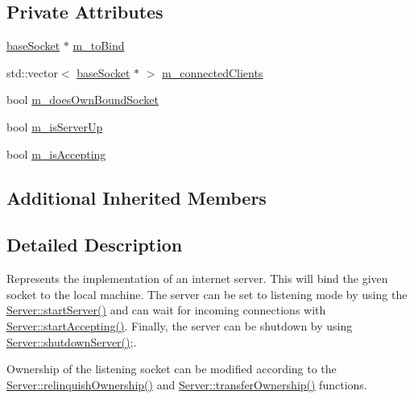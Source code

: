 \subsection*{Private Attributes}
\begin{DoxyCompactItemize}
\item 
\hyperlink{class_communication_1_1base_socket}{base\+Socket} $\ast$ \hyperlink{class_communication_1_1_server_a9e61ac5bb8ac2471084a4f2ea90347d8}{m\+\_\+to\+Bind}
\item 
std\+::vector$<$ \hyperlink{class_communication_1_1base_socket}{base\+Socket} $\ast$ $>$ \hyperlink{class_communication_1_1_server_ac26c1d233eb7a8bef029230bd6b8e18b}{m\+\_\+connected\+Clients}
\item 
bool \hyperlink{class_communication_1_1_server_afc99b5efd81c3d7cba80127a1972eec7}{m\+\_\+does\+Own\+Bound\+Socket}
\item 
bool \hyperlink{class_communication_1_1_server_a5b9dd26ba6c527a5d9547eeedc1b152b}{m\+\_\+is\+Server\+Up}
\item 
bool \hyperlink{class_communication_1_1_server_a9ab2cea7ed0c61b2c4b2833e35a76f75}{m\+\_\+is\+Accepting}
\end{DoxyCompactItemize}
\subsection*{Additional Inherited Members}


\subsection{Detailed Description}
Represents the implementation of an internet server. This will bind the given socket to the local machine. The server can be set to listening mode by using the \hyperlink{class_communication_1_1_server_a30f8961c165145504a3c29410c0b643c}{Server\+::start\+Server()} and can wait for incoming connections with \hyperlink{class_communication_1_1_server_aa005d6dfbb2f3d09bb6f5c31c7f61563}{Server\+::start\+Accepting()}. Finally, the server can be shutdown by using \hyperlink{class_communication_1_1_server_a9d80054a0eb0a8f4935a766344f9e076}{Server\+::shutdown\+Server()};. 

Ownership of the listening socket can be modified according to the \hyperlink{class_communication_1_1_server_a3f5fc277d677db87a1b3ec8a064cfe7c}{Server\+::relinquish\+Ownership()} and \hyperlink{class_communication_1_1_server_aa2e19a107eeaa9e4409654c99972b702}{Server\+::transfer\+Ownership()} functions. 

